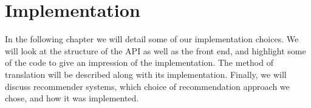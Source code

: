 \chapter{Implementation}
In the following chapter we will detail some of our implementation choices.
We will look at the structure of the API as well as the front end, and highlight some of the code to give an impression of the implementation.
The method of translation will be described along with its implementation.
Finally, we will discuss recommender systems, which choice of recommendation approach we chose, and how it was implemented.




